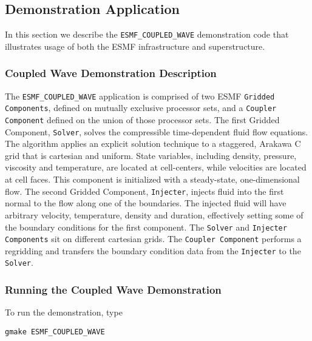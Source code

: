 \subsection{Demonstration Application}
\label{sec:demo}

In this section we describe the {\tt ESMF\_COUPLED\_WAVE} demonstration 
code that illustrates usage of both the ESMF infrastructure and superstructure. 

\subsubsection{Coupled Wave Demonstration Description}

The {\tt ESMF\_COUPLED\_WAVE} application is comprised of two ESMF 
{\tt Gridded Components}, defined on mutually exclusive processor sets, 
and a {\tt Coupler Component} defined on the union of those processor sets.  
The first Gridded Component, {\tt Solver}, solves the compressible 
time-dependent fluid flow equations.  The algorithm 
applies an explicit solution technique to a staggered, Arakawa C grid 
that is cartesian and uniform.  State variables, including density, 
pressure, viscosity and temperature, are located at cell-centers, while 
velocities are located at cell faces.  This component is initialized 
with a steady-state, one-dimensional flow.  The second Gridded Component, 
{\tt Injecter}, injects fluid into the first normal to the flow along 
one of the boundaries.  The injected fluid will have arbitrary velocity, 
temperature, density and duration, effectively setting some of 
the boundary conditions for the first component.  The {\tt Solver} and 
{\tt Injecter Components} sit on different cartesian grids.  The
{\tt Coupler Component} performs a regridding and transfers the 
boundary condition data from the {\tt Injecter} to the {\tt Solver}.

\subsubsection{Running the Coupled Wave Demonstration}

To run the demonstration, type 

\begin{verbatim}
gmake ESMF_COUPLED_WAVE
\end{verbatim}





























